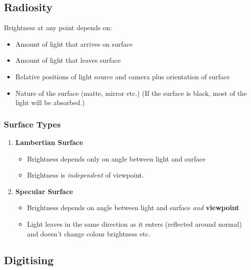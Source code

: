 \documentclass[english, 10pt]{article}
\begin{document}
\subsection{Radiosity}

  Brightness at any point depends on:

  \begin{itemize}
  \itemsep1pt\parskip0pt
  \item
    Amount of light that arrives on surface
  \item
    Amount of light that leaves surface
  \item
    Relative positions of light source and camera plus orientation of
    surface
  \item
    Nature of the surface (matte, mirror etc.) (If the surface is black,
    most of the light will be absorbed.)
 \end{itemize}
 
 \subsubsection{Surface Types}
 
    \begin{enumerate}
    \def\labelenumi{\arabic{enumi}.}
    \itemsep1pt\parskip0pt
    \item
     \textbf{Lambertian Surface}

      \begin{itemize}
      \itemsep1pt\parskip0pt
      \item
        Brightness depends only on angle between light and surface
      \item
        Brightness is \emph{independent} of viewpoint.
      \end{itemize}
    \item
      \textbf{Specular Surface}

      \begin{itemize}
      \itemsep1pt\parskip0pt
      \item
        Brightness depends on angle between light and surface \emph{and}
        \textbf{viewpoint}
      \item
        Light leaves in the same direction as it enters (reflected
        around normal) and doesn't change colour brightness etc.
      \end{itemize}
    \end{enumerate}

\subsection{Digitising}\label{digitising}
\end{document}
